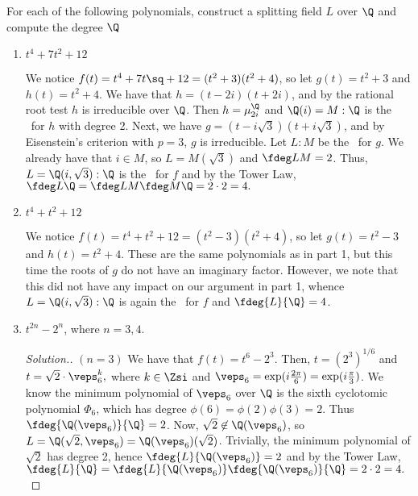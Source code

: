 \documentclass{article}
\begin{document}
\setcounter{section}{4}
\begin{exercise}
  For each of the following polynomials, construct a splitting field \( L \) over \( \Q \) and compute the degree \( \index{L}{\Q} \)
\end{exercise}

\begin{enumerate}
\item \( t^4+7t^2+12 \)
\begin{solution}
  We notice \( f(t) = t^4+7t\sq+12 = (t^2+3)(t^2+4) \), so let \( g(t) = t^2+3 \) and \( h(t) = t^2+4 \).
  We have that \( h=(t-2i)(t+2i) \), and by the rational root test \( h \) is irreducible over \( \Q \).
  Then \( h = \mu_{2i}^\Q \) and \( \Q(i)=M:\Q \) is the \sfe~for \( h \) with degree 2.
  Next, we have \( g = (t-i\sqrt 3)(t+i\sqrt 3) \), and by Eisenstein's criterion with \( p=3 \), \( g \) is irreducible.
  Let \( L:M \) be the \sfe~for \( g \).
  We already have that \( i\in M \), so \( L=M(\sqrt 3) \) and \( \fdeg L M = 2 \).
  Thus, \( L=\Q(i,\sqrt 3):\Q \) is the \sfe~for \( f \) and by the Tower Law, \( \fdeg L \Q = \fdeg L M \fdeg M \Q = 2\cdot 2 = 4. \)
\end{solution}

\item \( t^4+t^2+12 \)
\begin{solution}
  We notice \( f(t) = t^4+t^2+12 = (t^2-3)(t^2+4) \), so let \( g(t) = t^2-3 \) and \( h(t) = t^2+4 \).
  These are the same polynomials as in part 1, but this time the roots of \( g \) do not have an imaginary factor.
  However, we note that this did not have any impact on our argument in part 1, whence \( L = \Q(i,\sqrt 3):\Q \) is again the \sfe~for \( f \) and \( \fdeg{L}{\Q} = 4 \).
\end{solution}

\item \( t^{2n}-2^n \), where \( n=3,4 \).

\begin{proof}[Solution.] \( (n=3) \)
  We have that \( f(t) = t^6 - 2^3 \).
  Then, \( t = (2^3)^{1/6} \) and \( t = \sqrt{2}\cdot \veps_6^k, \) where \( k\in\Zsi \) and \( \veps_6=\exp(i\frac{2\pi}{6})=\exp(i\frac{\pi}{3}) \).
    We know the minimum polynomial of \( \veps_6 \) over \( \Q \) is the sixth cyclotomic polynomial \( \Phi_6 \), which has degree \( \phi(6) = \phi(2)\phi(3) = 2 \).
  Thus \( \fdeg{\Q(\veps_6)}{\Q} = 2 \).
  Now, \( \sqrt 2\not\in \Q(\veps_6) \), so \( L=\Q(\sqrt 2, \veps_6)=\Q(\veps_6)(\sqrt 2) \).
  Trivially, the minimum polynomial of \( \sqrt 2 \) has degree 2, hence \( \fdeg{L}{\Q(\veps_6)} = 2 \) and by the Tower Law, \( \fdeg{L}{\Q}=\fdeg{L}{\Q(\veps_6)}\fdeg{\Q(\veps_6)}{\Q} = 2\cdot 2 = 4. \)


\end{proof}
\end{enumerate}
\end{document}
